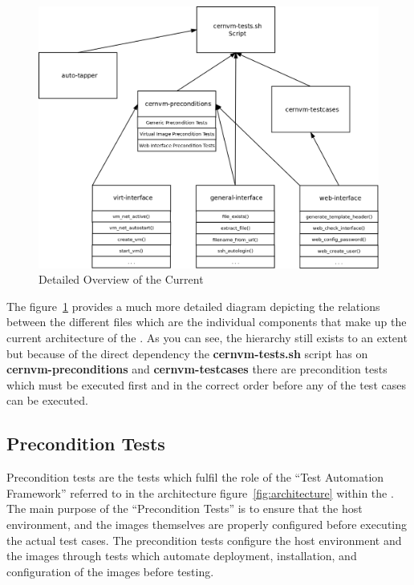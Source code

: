 \begin{figure}[hbp]
	\begin{center}
		\includegraphics[scale=0.25]{img/detailed_framework.png}
	\end{center}
	\caption{Detailed Overview of the Current \cernvmtestframework}
	\label{fig:detailedarchitecture}
\end{figure}

The figure~\ref{fig:detailedarchitecture} provides a much more detailed diagram depicting the relations between the different files which are the
individual components that make up the current architecture of the \cernvmtestframework. As you can see, the hierarchy still exists to an extent
but because of the direct dependency the {\bf cernvm-tests.sh} script has on {\bf cernvm-preconditions} and {\bf cernvm-testcases} there are
precondition tests which must be executed first and in the correct order before any of the test cases can be executed.




\subsection{Precondition Tests}
\label{sec:preconditiontests}

Precondition tests are the tests which fulfil the role of the ``Test Automation Framework'' referred to in the \tapper architecture
figure~\ref{fig:architecture} within the \cernvmtestframework. The main purpose of the ``Precondition Tests'' is to ensure that the
host environment, and the \cernvm images themselves are properly configured before executing the actual \cernvmreleasetesting test
cases. The precondition tests configure the host environment and the \cernvm images through tests which automate deployment, 
installation, and configuration of the \cernvm images before testing.

